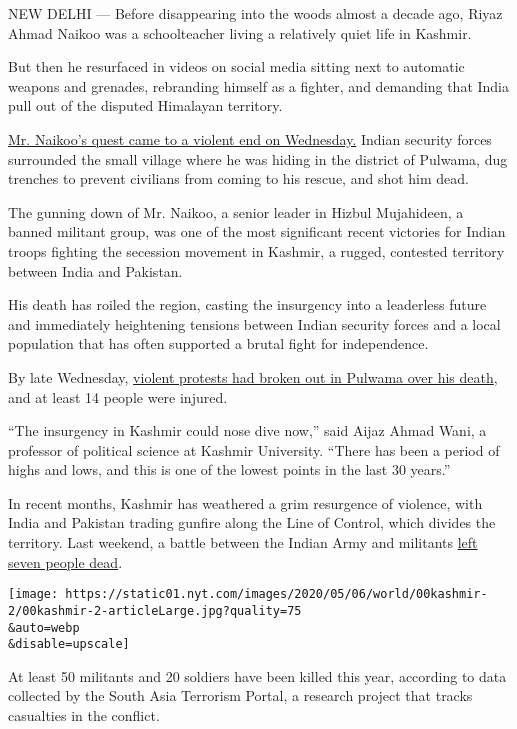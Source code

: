 NEW DELHI --- Before disappearing into the woods almost a decade ago,
Riyaz Ahmad Naikoo was a schoolteacher living a relatively quiet life in
Kashmir.

But then he resurfaced in videos on social media sitting next to
automatic weapons and grenades, rebranding himself as a fighter, and
demanding that India pull out of the disputed Himalayan territory.

\href{https://indianexpress.com/article/india/top-militant-commander-trapped-encounter-ongoing-in-jk/}{Mr.
Naikoo's quest came to a violent end on Wednesday.} Indian security
forces surrounded the small village where he was hiding in the district
of Pulwama, dug trenches to prevent civilians from coming to his rescue,
and shot him dead.

The gunning down of Mr. Naikoo, a senior leader in Hizbul Mujahideen, a
banned militant group, was one of the most significant recent victories
for Indian troops fighting the secession movement in Kashmir, a rugged,
contested territory between India and Pakistan.

His death has roiled the region, casting the insurgency into a
leaderless future and immediately heightening tensions between Indian
security forces and a local population that has often supported a brutal
fight for independence.

By late Wednesday,
\href{https://thekashmirwalla.com/2020/05/pulwama-gunfight-14-civilians-injured-in-clashes/}{violent
protests had broken out in Pulwama over his death}, and at least 14
people were injured.

``The insurgency in Kashmir could nose dive now,'' said Aijaz Ahmad
Wani, a professor of political science at Kashmir University. ``There
has been a period of highs and lows, and this is one of the lowest
points in the last 30 years.''

In recent months, Kashmir has weathered a grim resurgence of violence,
with India and Pakistan trading gunfire along the Line of Control, which
divides the territory. Last weekend, a battle between the Indian Army
and militants
\href{https://www.nytimes.com/2020/05/03/world/asia/kashmir-gun-battle-army-militants.html}{left
seven people dead}.

\texttt{[image: https://static01.nyt.com/images/2020/05/06/world/00kashmir-2/00kashmir-2-articleLarge.jpg?quality=75\\\&auto=webp\\\&disable=upscale]}

At least 50 militants and 20 soldiers have been killed this year,
according to data collected by the South Asia Terrorism Portal, a
research project that tracks casualties in the conflict.

